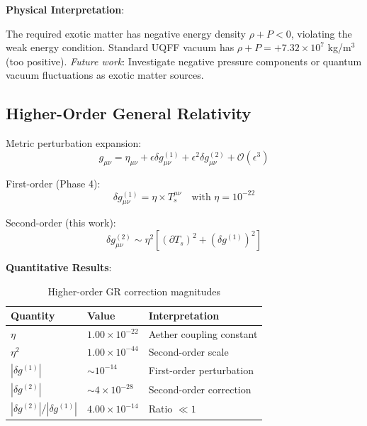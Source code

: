 \documentclass[12pt,a4paper]{article}
\begin{document}
\textbf{Physical Interpretation}:

The required exotic matter has negative energy density $\rho + P < 0$, violating the weak energy condition. Standard UQFF vacuum has $\rho + P = +7.32 \times 10^7$ kg/m$^3$ (too positive). \textit{Future work}: Investigate negative pressure components or quantum vacuum fluctuations as exotic matter sources.

\subsection{Higher-Order General Relativity}

Metric perturbation expansion:
\begin{equation}
g_{\mu\nu} = \eta_{\mu\nu} + \epsilon \delta g_{\mu\nu}^{(1)} + \epsilon^2 \delta g_{\mu\nu}^{(2)} + \mathcal{O}(\epsilon^3)
\label{eq:metric_expansion}
\end{equation}

First-order (Phase 4):
\begin{equation}
\delta g_{\mu\nu}^{(1)} = \eta \times T_s^{\mu\nu} \quad \text{with } \eta = 10^{-22}
\end{equation}

Second-order (this work):
\begin{equation}
\delta g_{\mu\nu}^{(2)} \sim \eta^2 \left[ (\partial T_s)^2 + (\delta g^{(1)})^2 \right]
\end{equation}

\textbf{Quantitative Results}:

\begin{table}[H]
\centering
\begin{tabular}{@{}lll@{}}
\toprule
\textbf{Quantity} & \textbf{Value} & \textbf{Interpretation} \\
\midrule
$\eta$ & $1.00 \times 10^{-22}$ & Aether coupling constant \\
$\eta^2$ & $1.00 \times 10^{-44}$ & Second-order scale \\
$|\delta g^{(1)}|$ & $\sim 10^{-14}$ & First-order perturbation \\
$|\delta g^{(2)}|$ & $\sim 4 \times 10^{-28}$ & Second-order correction \\
$|\delta g^{(2)}|/|\delta g^{(1)}|$ & $4.00 \times 10^{-14}$ & Ratio $\ll 1$ \\
\bottomrule
\end{tabular}
\caption{Higher-order GR correction magnitudes}
\label{tab:higher_order_gr}
\end{table}
\end{document}
